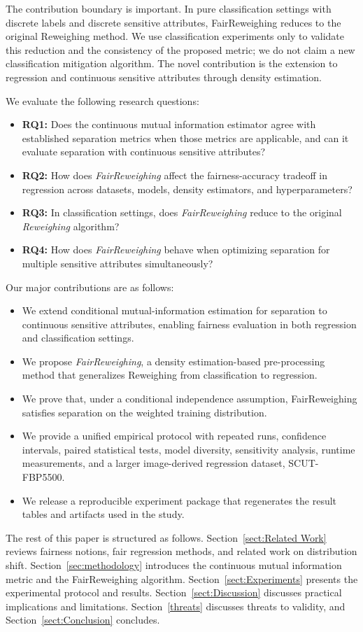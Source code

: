 The contribution boundary is important. In pure classification settings with discrete labels and discrete sensitive attributes, FairReweighing reduces to the original Reweighing method. We use classification experiments only to validate this reduction and the consistency of the proposed metric; we do not claim a new classification mitigation algorithm. The novel contribution is the extension to regression and continuous sensitive attributes through density estimation.

We evaluate the following research questions:

\begin{itemize}
  \item \textbf{RQ1:} Does the continuous mutual information estimator agree with established separation metrics when those metrics are applicable, and can it evaluate separation with continuous sensitive attributes?
  \item \textbf{RQ2:} How does \emph{FairReweighing} affect the fairness-accuracy tradeoff in regression across datasets, models, density estimators, and hyperparameters?
  \item \textbf{RQ3:} In classification settings, does \emph{FairReweighing} reduce to the original \emph{Reweighing} algorithm?
  \item \textbf{RQ4:} How does \emph{FairReweighing} behave when optimizing separation for multiple sensitive attributes simultaneously?
\end{itemize}

Our major contributions are as follows:
\begin{itemize}
  \item We extend conditional mutual-information estimation for separation to continuous sensitive attributes, enabling fairness evaluation in both regression and classification settings.
  \item We propose \emph{FairReweighing}, a density estimation-based pre-processing method that generalizes Reweighing from classification to regression.
  \item We prove that, under a conditional independence assumption, FairReweighing satisfies separation on the weighted training distribution.
  \item We provide a unified empirical protocol with repeated runs, confidence intervals, paired statistical tests, model diversity, sensitivity analysis, runtime measurements, and a larger image-derived regression dataset, SCUT-FBP5500.
  \item We release a reproducible experiment package that regenerates the result tables and artifacts used in the study.
\end{itemize}
The rest of this paper is structured as follows. Section~\ref{sect:Related Work} reviews fairness notions, fair regression methods, and related work on distribution shift. Section~\ref{sec:methodology} introduces the continuous mutual information metric and the FairReweighing algorithm. Section~\ref{sect:Experiments} presents the experimental protocol and results. Section~\ref{sect:Discussion} discusses practical implications and limitations. Section~\ref{threats} discusses threats to validity, and Section~\ref{sect:Conclusion} concludes.

